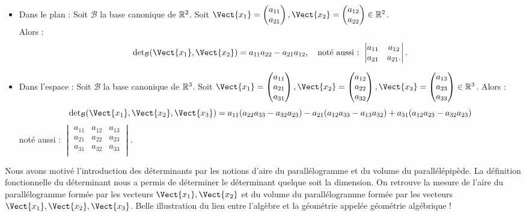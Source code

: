 \documentclass{book}
\begin{document}
\begin{Theoreme}
\begin{itemize}
\item Dans le plan : Soit $\mathcal{B}$ la base canonique de $\mathbb{R}^2$.  Soit $\Vect{x_1}=\begin{pmatrix}
a_{11}\\a_{21}
\end{pmatrix},\Vect{x_2}=\begin{pmatrix}
a_{12}\\a_{22}
\end{pmatrix}\in\R^2$.\\
Alors :
$$\det_\mathcal{B}(\Vect{x_1},\Vect{x_2})=a_{11}a_{22}-a_{21}a_{12},\quad \text{noté aussi : } \begin{vmatrix}
a_{11}&a_{12}\\a_{21}&a_{21}.\\
\end{vmatrix}.$$
\item Dans l'espace : Soit $\mathcal{B}$ la base canonique de $\mathbb{R}^3$.  Soit $\Vect{x_1}=\begin{pmatrix}
a_{11}\\a_{21}\\a_{31}
\end{pmatrix},\Vect{x_2}=\begin{pmatrix}
a_{12}\\a_{22}\\a_{32}
\end{pmatrix},\Vect{x_3}=\begin{pmatrix}
a_{13}\\a_{23}\\a_{33}
\end{pmatrix}\in\R^3$. Alors :
$$\det_\mathcal{B}(\Vect{x_1},\Vect{x_2},\Vect{x_3})=a_{11}(a_{22}a_{33}-a_{32}a_{23})-a_{21}(a_{12}a_{33}-a_{13}a_{32})+a_{31}(a_{12}a_{23}-a_{32}a_{23})$$
noté aussi : $\begin{vmatrix}
a_{11}&a_{12}&a_{13}\\a_{21}&a_{22}&a_{23}\\a_{31}&a_{32}&a_{33}\\
\end{vmatrix}.$  
\end{itemize}
\end{Theoreme}
\begin{Texte}
Nous avons motivé l'introduction des déterminants par les notions d'aire du parallélogramme  et du volume du parallélépipède. La définition fonctionnelle du déterminant nous a permis 
de déterminer le déterminant quelque soit la dimension. On retrouve  la mesure de l'aire du parallélogramme formée par les vecteurs  $\Vect{x_1},\Vect{x_2}$ et du volume du parallélogramme formée par les vecteurs  $\Vect{x_1},\Vect{x_2},\Vect{x_3}$. Belle illustration du lien entre l'algèbre et la géométrie appelée géométrie algébrique !  
\end{Texte}
\end{document}
